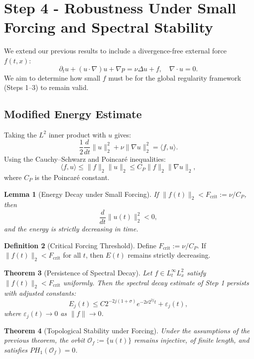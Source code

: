 \documentclass[11pt]{article}
\newtheorem{theorem}{Theorem}[section]
\newtheorem{lemma}[theorem]{Lemma}
\theoremstyle{definition}
\newtheorem{definition}[theorem]{Definition}
\begin{document}
\section{Step 4 - Robustness Under Small Forcing and Spectral Stability}
\label{sec:step4}

We extend our previous results to include a divergence-free external force $f(t,x)$:
\[
\partial_t u + (u \cdot \nabla)u + \nabla p = \nu \Delta u + f,\quad \nabla \cdot u = 0.
\]
We aim to determine how small $f$ must be for the global regularity framework (Steps 1–3) to remain valid.

\subsection*{Modified Energy Estimate}
Taking the $L^2$ inner product with $u$ gives:
\[
\frac{1}{2} \frac{d}{dt} \|u\|_2^2 + \nu \|\nabla u\|_2^2 = \langle f, u \rangle.
\]
Using the Cauchy–Schwarz and Poincaré inequalities:
\[
\langle f, u \rangle \le \|f\|_2 \|u\|_2 \le C_P \|f\|_2 \|\nabla u\|_2,
\]
where $C_P$ is the Poincaré constant.

\begin{lemma}[Energy Decay under Small Forcing]
If $\|f(t)\|_2 < F_{\mathrm{crit}} := \nu / C_P$, then
\[
\frac{d}{dt} \|u(t)\|_2^2 < 0,
\]
and the energy is strictly decreasing in time.
\end{lemma}

\begin{definition}[Critical Forcing Threshold]
Define $F_{\mathrm{crit}} := \nu / C_P$. If $\|f(t)\|_2 < F_{\mathrm{crit}}$ for all $t$, then $E(t)$ remains strictly decreasing.
\end{definition}

\begin{theorem}[Persistence of Spectral Decay]
Let $f \in L^\infty_t L^2_x$ satisfy $\|f(t)\|_2 < F_{\mathrm{crit}}$ uniformly. Then the spectral decay estimate of Step 1 persists with adjusted constants:
\[
E_j(t) \le C 2^{-2j(1+\sigma)} e^{-2\nu 2^{2j}t} + \varepsilon_j(t),
\]
where $\varepsilon_j(t) \to 0$ as $\|f\| \to 0$.
\end{theorem}

\begin{theorem}[Topological Stability under Forcing]
Under the assumptions of the previous theorem, the orbit $\mathcal{O}_f := \{ u(t) \}$ remains injective, of finite length, and satisfies $PH_1(\mathcal{O}_f) = 0$.
\end{theorem}
\end{document}
